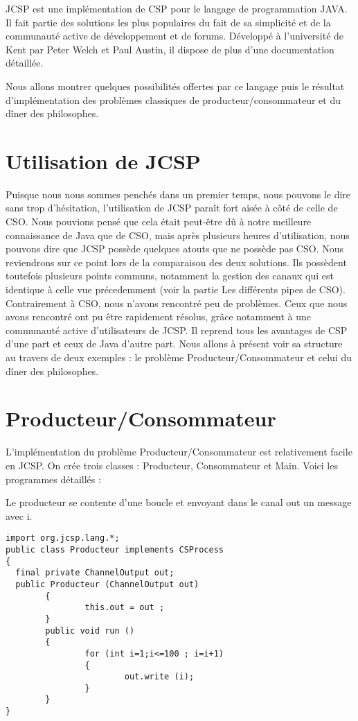 \documentclass[a4paper,11pt,french]{report}
\begin{document}
\lettrine{J}{CSP} est une implémentation de CSP pour le langage de programmation JAVA. Il fait partie des solutions les plus populaires du fait de sa simplicité et de la communauté active de développement et de forums. Développé à l'université de Kent par Peter Welch et Paul Austin, il dispose de plus d'une documentation détaillée.

Nous allons montrer quelques possibilités offertes par ce langage puis le résultat d'implémentation des problèmes classiques de producteur/consommateur et du dîner des philosophes.

\section{Utilisation de JCSP}

Puisque nous nous sommes penchés dans un premier temps, nous pouvons le dire sans trop d'hésitation, l'utilisation de JCSP paraît fort aisée à côté de celle de CSO. Nous pouvions pensé que cela était peut-être dû à notre meilleure connaissance de Java que de CSO, mais après plusieurs heures d'utilisation, nous pouvons dire que JCSP possède quelques atouts que ne possède pas CSO. Nous reviendrons sur ce point lors de la comparaison des deux solutions.
Ils possèdent toutefois plusieurs points communs, notamment la gestion des canaux qui est identique à celle vue précedemment (voir la partie Les différents pipes de CSO).
Contrairement à CSO, nous n'avons rencontré peu de problèmes. Ceux que nous avons rencontré ont pu être rapidement résolus, grâce notamment à une communauté active d'utilisateurs de JCSP. Il reprend tous les avantages de CSP d'une part et ceux de Java d'autre part. Nous allons à présent voir sa structure au travers de deux exemples : le problème Producteur/Consommateur et celui du dîner des philosophes.

\section{Producteur/Consommateur}

L'implémentation du problème Producteur/Consommateur est relativement facile en JCSP. On crée trois classes : Producteur, Consommateur et Main. Voici les programmes détaillés :

Le producteur se contente d'une boucle et envoyant dans le canal out un message avec i. 

\begin{lstlisting}[frame=trBL,title={Producteurs-Consommateurs: Producteur.java}]
import org.jcsp.lang.*;
public class Producteur implements CSProcess
{
  final private ChannelOutput out;
  public Producteur (ChannelOutput out)
        {
                this.out = out ;
        }
        public void run ()
        {
                for (int i=1;i<=100 ; i=i+1)
                {
                        out.write (i);
                }
        }
}
\end{lstlisting}
\end{document}

